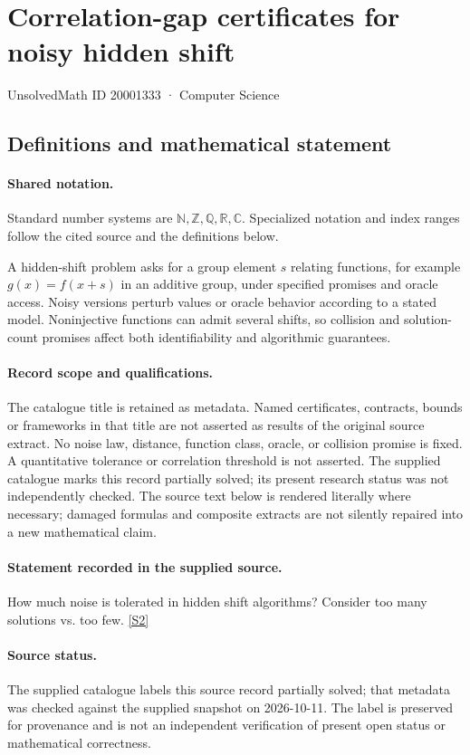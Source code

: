 \documentclass[11pt]{article}
\newcommand{\sref}[2]{\hyperlink{source:#1:#2}{[S#2]}}
\begin{document}
\setcounter{section}{20001332}
\section{Correlation-gap certificates for noisy hidden shift}\label{20001333}
{\small\sffamily UnsolvedMath ID 20001333 · Computer Science}
\subsection{Definitions and mathematical statement}

\paragraph{Shared notation.}Standard number systems are $\mathbb N,\mathbb Z,\mathbb Q,\mathbb R,\mathbb C$. Specialized notation and index ranges follow the cited source and the definitions below.


A hidden-shift problem asks for a group element $s$ relating functions, for example $g(x)=f(x+s)$ in an additive group, under specified promises and oracle access. Noisy versions perturb values or oracle behavior according to a stated model. Noninjective functions can admit several shifts, so collision and solution-count promises affect both identifiability and algorithmic guarantees.
\paragraph{Record scope and qualifications.}
The catalogue title is retained as metadata. Named certificates, contracts, bounds or frameworks in that title are not asserted as results of the original source extract.
No noise law, distance, function class, oracle, or collision promise is fixed. A quantitative tolerance or correlation threshold is not asserted. The supplied catalogue marks this record partially solved; its present research status was not independently checked.
The source text below is rendered literally where necessary; damaged formulas and composite extracts are not silently repaired into a new mathematical claim.
\paragraph{Statement recorded in the supplied source.}
How much noise is tolerated in hidden shift algorithms? Consider too many solutions vs. too few. \sref{20001333}{2}
\paragraph{Source status.}
The supplied catalogue labels this source record partially solved; that metadata was checked against the supplied snapshot on 2026-10-11. The label is preserved for provenance and is not an independent verification of present open status or mathematical correctness.
\end{document}
